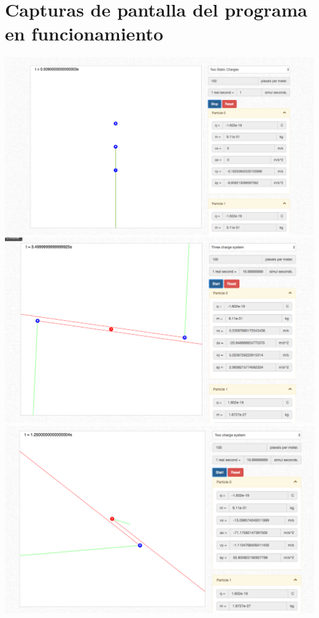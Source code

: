 \documentclass[11pt]{article}
\begin{document}
\section{Capturas de pantalla del programa en funcionamiento}
\label{sec-9}
\includegraphics[width=\linewidth]{sc1.png}
\includegraphics[width=\linewidth]{sc2.png}
\includegraphics[width=\linewidth]{sc3.png}
\end{document}
